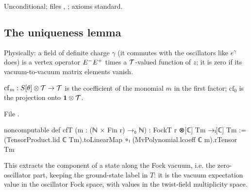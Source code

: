 \begin{status}
Unconditional; files , ;
axioms standard.
\end{status}

\subsection{The uniqueness lemma}
Physically: a field of definite charge $\gamma$ (it commutes with the oscillators like
$e^{\gamma}$ does) is a vertex operator $E^{-}E^{+}$ times a $\mathcal{T}$-valued
function of $z$; it is zero if its vacuum-to-vacuum matrix elements vanish.

\begin{definition}
$\mathrm{cf}_m:S[\theta]\otimes\mathcal{T}\to\mathcal{T}$ is the coefficient of the monomial $m$ in the
first factor; $\mathrm{cf}_0$ is the projection onto $\mathbf 1\otimes\mathcal{T}$.
\end{definition}
\noindent File .
\begin{leancode}
noncomputable def cfT (m : (ℕ × Fin r) →₀ ℕ) : FockT r ⊗[ℂ] Tm →ₗ[ℂ] Tm :=
  (TensorProduct.lid ℂ Tm).toLinearMap ∘ₗ (MvPolynomial.lcoeff ℂ m).rTensor Tm
\end{leancode}

\begin{physics}
This extracts the component of a state along the Fock vacuum, i.e. the zero-oscillator part, keeping the ground-state label in $T$: it is the vacuum expectation value in the oscillator Fock space, with values in the twist-field multiplicity space.
\end{physics}


